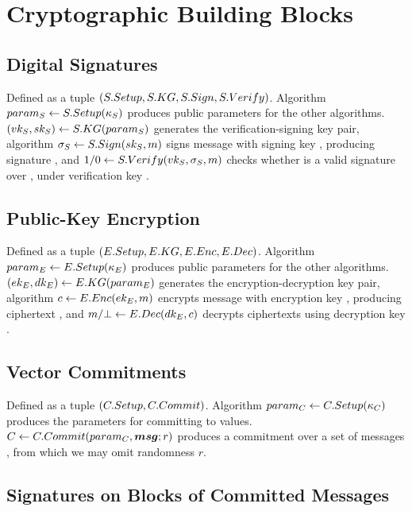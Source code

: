 \section{Cryptographic Building Blocks}
\label{app:crypto-building-blocks}

\subsection{Digital Signatures}
\label{sapp:digital-signatures}

Defined as a tuple $(S.Setup,S.KG,S.Sign,S.Verify)$. Algorithm $param_{S} \gets
S.Setup(\kappa_{S})$ produces public parameters for the other algorithms.
$(vk_{S},sk_{S}) \gets S.KG(param_{S})$ generates the verification-signing key
pair, algorithm $\sigma_{S} \gets S.Sign(sk_{S},m)$ signs message \msg with
signing key \Ssk, producing signature \Ssig, and $1/0 \gets S.Verify(vk_{S},
\sigma_{S},m)$ checks whether \Ssig is a valid signature over \msg, under
verification key \Svk. 

\subsection{Public-Key Encryption}
\label{sapp:pk-encryption}

Defined as a tuple $(E.Setup,E.KG,E.Enc,E.Dec)$. Algorithm $param_{E} \gets
E.Setup(\kappa_{E})$ produces public parameters for the other algorithms.
$(ek_{E},dk_{E}) \gets E.KG(param_{E})$ generates the encryption-decryption key
pair, algorithm $c \gets E.Enc(ek_{E},m)$ encrypts message \msg with
encryption key \Eek, producing ciphertext \Ec, and $m/\bot \gets E.Dec(dk_{E},
c)$ decrypts ciphertexts using decryption key \Edk. 

\subsection{Vector Commitments}
\label{sapp:vector-commitments}

Defined as a tuple $(C.Setup,C.Commit)$. Algorithm $param_C \gets
C.Setup(\kappa_{C})$ produces the parameters for committing to values. $C
\gets C.Commit(param_C, \boldsymbol{msg}; r)$ produces a commitment \Ccom over a set of
messages \msgset, from which we may omit randomness $r$. 


\subsection{Signatures on Blocks of Committed Messages}
\label{sapp:sbcm}

